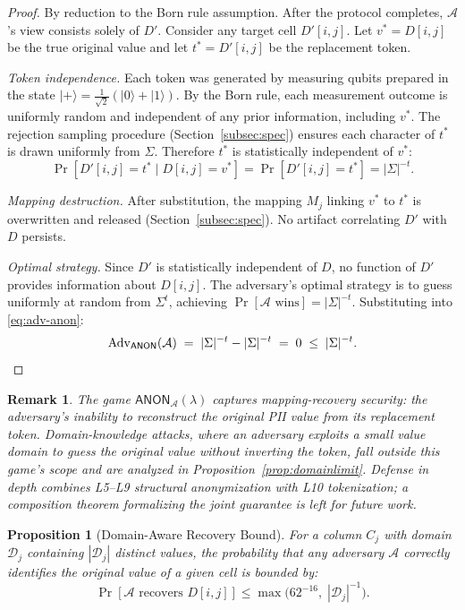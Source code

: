 \documentclass[journal]{IEEEtran}
\newtheorem{proposition}[theorem]{Proposition}
\newtheorem*{remark}{Remark}
\begin{document}
\begin{proof}
By reduction to the Born rule assumption. After the protocol completes, $\mathcal{A}$'s view consists solely of $D'$. Consider any target cell $D'[i,j]$. Let $v^* = D[i,j]$ be the true original value and let $t^* = D'[i,j]$ be the replacement token.

\emph{Token independence.} Each token was generated by measuring qubits prepared in the state $|{+}\rangle = \frac{1}{\sqrt{2}}(|0\rangle + |1\rangle)$. By the Born rule, each measurement outcome is uniformly random and independent of any prior information, including $v^*$. The rejection sampling procedure (Section~\ref{subsec:spec}) ensures each character of $t^*$ is drawn uniformly from $\Sigma$. Therefore $t^*$ is statistically independent of $v^*$:
\[
\Pr[D'[i,j] {=} t^* \mid D[i,j] {=} v^*]
  = \Pr[D'[i,j] {=} t^*] = |\Sigma|^{-t}.
\]

\emph{Mapping destruction.} After substitution, the mapping $M_j$ linking $v^*$ to $t^*$ is overwritten and released (Section~\ref{subsec:spec}). No artifact correlating $D'$ with $D$ persists.

\emph{Optimal strategy.} Since $D'$ is statistically independent of $D$, no function of $D'$ provides information about $D[i,j]$. The adversary's optimal strategy is to guess uniformly at random from $\Sigma^t$, achieving $\Pr[\mathcal{A}\text{ wins}] = |\Sigma|^{-t}$. Substituting into \eqref{eq:adv-anon}:
\[
\mathrm{Adv}_{\mathsf{ANON}}(\mathcal{A}) \;=\; |\Sigma|^{-t} - |\Sigma|^{-t} \;=\; 0 \;\leq\; |\Sigma|^{-t}. \qedhere
\]
\end{proof}

\begin{remark}
The game $\mathsf{ANON}_{\mathcal{A}}(\lambda)$ captures \emph{mapping-recovery} security: the adversary's inability to reconstruct the original PII value from its replacement token. Domain-knowledge attacks, where an adversary exploits a small value domain to guess the original value without inverting the token, fall outside this game's scope and are analyzed in Proposition~\ref{prop:domainlimit}. Defense in depth combines L5--L9 structural anonymization with L10 tokenization; a composition theorem formalizing the joint guarantee is left for future work.
\end{remark}

\begin{proposition}[Domain-Aware Recovery Bound]
\label{prop:domain}
For a column $C_j$ with domain $\mathcal{D}_j$ containing $|\mathcal{D}_j|$ distinct values, the probability that any adversary $\mathcal{A}$ correctly identifies the original value of a given cell is bounded by:
\begin{equation}
\Pr[\mathcal{A} \text{ recovers } D[i,j]] \leq \max\bigl(62^{-16},\; |\mathcal{D}_j|^{-1}\bigr).
\end{equation}
\end{proposition}
\end{document}

